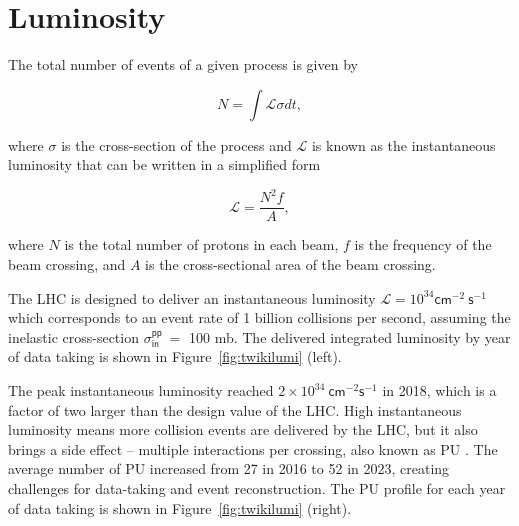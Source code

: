 \section{Luminosity}
\label{sec:Lumi}

The total number of events of a given process is given by 

\begin{equation}
N=\int\mathcal{L}\sigma dt,
\end{equation}

where $\sigma$ is the cross-section of the process and $\mathcal{L}$ is known as the instantaneous luminosity that can be written in a simplified form

\begin{equation}
\mathcal{L}=\frac{N^2f}{A},
\end{equation}

where $N$ is the total number of protons in each beam, $f$ is the frequency of the beam crossing, and $A$ is the cross-sectional area of the beam crossing.

The \ac{LHC} is designed to deliver an instantaneous luminosity $\mathcal{L}=10^{34}\textsf{cm}^{-2}~\textsf{s}^{-1}$ which corresponds to an event rate of 1 billion collisions per second, assuming the inelastic cross-section $\sigma^{\textsf{pp}}_{\textsf{in}}~=$ 100 mb. The delivered integrated luminosity by year of data taking is shown in Figure~\ref{fig:twikilumi} (left).

The peak instantaneous luminosity reached $2\times10^{34}~\textsf{cm}^{-2}\textsf{s}^{-1}$ in 2018, which is a factor of two larger than the design value of the \ac{LHC}. High instantaneous luminosity means more collision events are delivered by the \ac{LHC}, but it also brings a side effect -- multiple interactions per crossing, also known as \ac{PU} . The average number of \ac{PU} increased from 27 in 2016 to 52 in 2023, creating challenges for data-taking and event reconstruction. The \ac{PU} profile for each year of data taking is shown in Figure~\ref{fig:twikilumi} (right).

